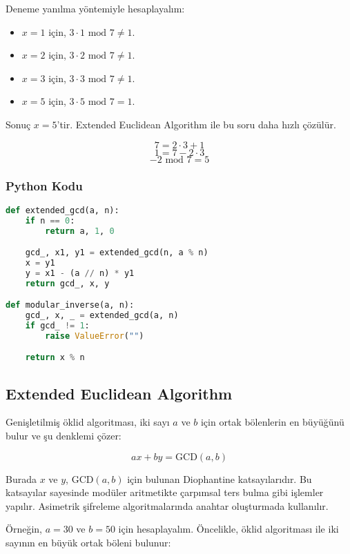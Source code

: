 Deneme yanılma yöntemiyle hesaplayalım:

\begin{itemize}
    \item $x = 1$ için, $ 3 \cdot 1 \text{ mod } 7 \neq 1$.
    \item $x = 2$ için, $ 3 \cdot 2 \text{ mod } 7 \neq 1$.
    \item $x = 3$ için, $ 3 \cdot 3 \text{ mod } 7 \neq 1$.
    \item $x = 5$ için, $ 3 \cdot 5 \text{ mod } 7 = 1$.
\end{itemize}

Sonuç $x = 5$'tir. Extended Euclidean Algorithm ile bu soru daha hızlı çözülür.

\[ 7 = 2 \cdot 3 + 1 \]
\[ 1 = 7 - 2 \cdot 3 \]
\[ -2 \text{ mod } 7 = 5 \]

\subsubsection{Python Kodu}

\begin{lstlisting}[language=Python]
def extended_gcd(a, n):
    if n == 0:
        return a, 1, 0

    gcd_, x1, y1 = extended_gcd(n, a % n)
    x = y1
    y = x1 - (a // n) * y1
    return gcd_, x, y

def modular_inverse(a, n):
    gcd_, x, _ = extended_gcd(a, n)
    if gcd_ != 1:
        raise ValueError("")

    return x % n
\end{lstlisting}

\newpage

\subsection{Extended Euclidean Algorithm}

Genişletilmiş öklid algoritması, iki sayı $a$ ve $b$ için ortak bölenlerin en büyüğünü bulur ve şu denklemi çözer:

\[ ax + by = \text{GCD}(a, b) \]

Burada $x$ ve $y$, $\text{GCD}(a, b)$ için bulunan Diophantine katsayılarıdır. Bu katsayılar sayesinde modüler aritmetikte çarpımsal ters bulma gibi işlemler yapılır. Asimetrik şifreleme algoritmalarında anahtar oluşturmada kullanılır.

Örneğin, $a = 30$ ve $b = 50$ için hesaplayalım. Öncelikle, öklid algoritması ile iki sayının en büyük ortak böleni bulunur:

